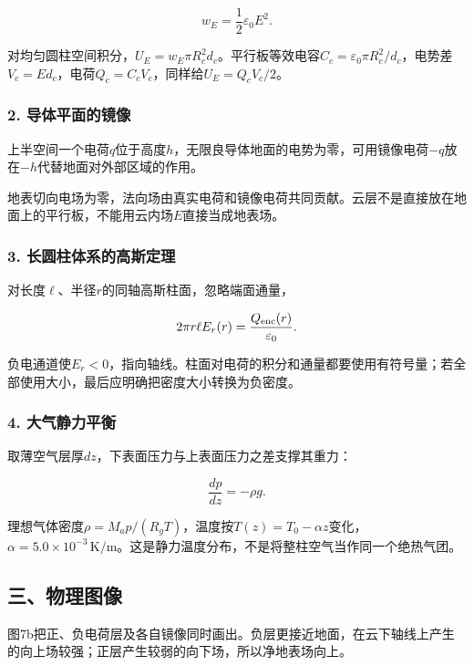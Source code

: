 \documentclass[12pt,a4paper,fontset=fandol]{ctexart}
\begin{document}
\[
w_E=\frac12\varepsilon_0E^2.
\]

对均匀圆柱空间积分，\(U_E=w_E\pi R_c^2d_c\)。平行板等效电容\(C_c=\varepsilon_0\pi R_c^2/d_c\)，电势差\(V_c=Ed_c\)，电荷\(Q_c=C_cV_c\)，同样给\(U_E=Q_cV_c/2\)。

\subsubsection{2.
导体平面的镜像}\label{ux5bfcux4f53ux5e73ux9762ux7684ux955cux50cf}

上半空间一个电荷\(q\)位于高度\(h\)，无限良导体地面的电势为零，可用镜像电荷\(-q\)放在\(-h\)代替地面对外部区域的作用。

地表切向电场为零，法向场由真实电荷和镜像电荷共同贡献。云层不是直接放在地面上的平行板，不能用云内场\(E\)直接当成地表场。

\subsubsection{3.
长圆柱体系的高斯定理}\label{ux957fux5706ux67f1ux4f53ux7cfbux7684ux9ad8ux65afux5b9aux7406}

对长度\(\ell\)、半径\(r\)的同轴高斯柱面，忽略端面通量，

\[
2\pi r\ell E_r(r)=\frac{Q_{\rm enc}(r)}{\varepsilon_0}.
\]

负电通道使\(E_r<0\)，指向轴线。柱面对电荷的积分和通量都要使用有符号量；若全部使用大小，最后应明确把密度大小转换为负密度。

\subsubsection{4.
大气静力平衡}\label{ux5927ux6c14ux9759ux529bux5e73ux8861}

取薄空气层厚\(dz\)，下表面压力与上表面压力之差支撑其重力：

\[
\frac{dp}{dz}=-\rho g.
\]

理想气体密度\(\rho=M_ap/(R_gT)\)，温度按\(T(z)=T_0-\alpha z\)变化，\(\alpha=5.0\times10^{-3}\,\mathrm{K/m}\)。这是静力温度分布，不是将整柱空气当作同一个绝热气团。

\subsection{三、物理图像}\label{ux4e09ux7269ux7406ux56feux50cf-6}

图7b把正、负电荷层及各自镜像同时画出。负层更接近地面，在云下轴线上产生的向上场较强；正层产生较弱的向下场，所以净地表场向上。
\end{document}

